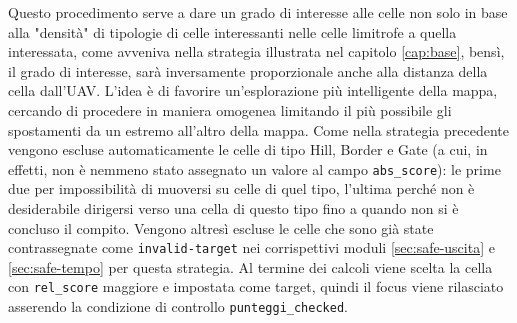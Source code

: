 Questo procedimento serve a dare un grado di interesse alle celle non solo in base alla "densità" di tipologie di celle interessanti nelle celle limitrofe a quella interessata, come avveniva nella strategia illustrata nel capitolo \ref{cap:base}, bensì, il grado di interesse, sarà inversamente proporzionale anche alla distanza della cella dall'UAV. L'idea è di favorire un'esplorazione più intelligente della mappa, cercando di procedere in maniera omogenea limitando il più possibile gli spostamenti da un estremo all'altro della mappa.
Come nella strategia precedente vengono escluse automaticamente le celle di tipo Hill, Border e Gate (a cui, in effetti, non è nemmeno stato assegnato un valore al campo \texttt{abs\_score}): le prime due per impossibilità di muoversi su celle di quel tipo, l'ultima perché non è desiderabile dirigersi verso una cella di questo tipo fino a quando non si è concluso il compito.
Vengono altresì escluse le celle che sono già state contrassegnate come \texttt{invalid-target} nei corrispettivi moduli \ref{sec:safe-uscita} e \ref{sec:safe-tempo} per questa strategia.
Al termine dei calcoli viene scelta la cella con \texttt{rel\_score} maggiore e impostata come target, quindi il focus viene rilasciato asserendo la condizione di controllo \texttt{punteggi\_checked}.

